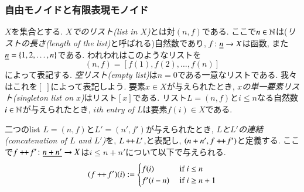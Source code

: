 
\subsubsection{自由モノイドと有限表現モノイド}\label{sec:free monoid}

\begin{definition}\label{def:list}


$X$を集合とする. \emph{$X$でのリスト(list in $X$)}とは対$(n,f)$である. ここで$n\in{\mathbb N}$は(\emph{リストの長さ(length of the list)}と呼ばれる)自然数であり, $f\colon\underline{n}\rightarrow X$は函数, また$\underline{n}=\{1,2,\ldots,n\}$である. われわれはこのようなリストを
$$(n,f)=[f(1),f(2),\ldots,f(n)]$$
によって表記する. \emph{空リスト(empty list)}は$n=0$である一意なリストである. 我々はこれを$[\;]$によって表記しよう. 要素$x\in X$が与えられたとき, \emph{$x$の単一要素リスト(singleton list on $x$)}はリスト$[x]$である. リスト$L=(n,f)$と$i\leq n$なる自然数$i\in{\mathbb N}$が与えられたとき, \emph{$i$th entry of $L$}は要素$f(i)\in X$である.


二つのlist $L=(n,f)$と$L'=(n',f')$が与えられたとき, \emph{$L$と$L'$の連結(concatenation of $L$ and $L'$)}を, $L+\!\!+\hspace{1pt} L'$,と表記し, $(n+n',f+\!\!+\hspace{1pt} f')$と定義する. ここで$f+\!\!+\hspace{1pt} f'\colon \underline{n+n'}\rightarrow X$は$i\leq n+n'$について以下で与えられる.
$$(f\plpl f')(i):=
\begin{cases}
f(i)&\tn{ if }i\leq n\\
f'(i-n)&\tn{ if }i\geq n+1
\end{cases}
$$
\end{definition}

